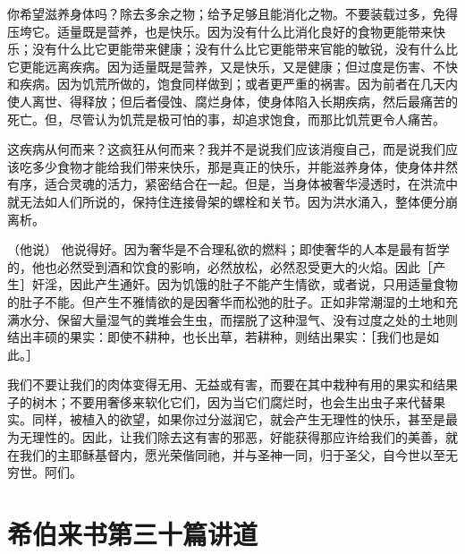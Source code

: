 你希望滋养身体吗？除去多余之物；给予足够且能消化之物。不要装载过多，免得压垮它。适量既是营养，也是快乐。因为没有什么比消化良好的食物更能带来快乐；没有什么比它更能带来健康；没有什么比它更能带来官能的敏锐，没有什么比它更能远离疾病。因为适量既是营养，又是快乐，又是健康；但过度是伤害、不快和疾病。因为饥荒所做的，饱食同样做到；或者更严重的祸害。因为前者在几天内使人离世、得释放；但后者侵蚀、腐烂身体，使身体陷入长期疾病，然后最痛苦的死亡。但，尽管认为饥荒是极可怕的事，却追求饱食，而那比饥荒更令人痛苦。\par

这疾病从何而来？这疯狂从何而来？我并不是说我们应该消瘦自己，而是说我们应该吃多少食物才能给我们带来快乐，那是真正的快乐，并能滋养身体，使身体井然有序，适合灵魂的活力，紧密结合在一起。但是，当身体被奢华浸透时，在洪流中就无法如人们所说的，保持住连接骨架的螺栓和关节。因为洪水涌入，整体便分崩离析。\par

（他说） 他说得好。因为奢华是不合理私欲的燃料；即使奢华的人本是最有哲学的，他也必然受到酒和饮食的影响，必然放松，必然忍受更大的火焰。因此［产生］奸淫，因此产生通奸。因为饥饿的肚子不能产生情欲，或者说，只用适量食物的肚子不能。但产生不雅情欲的是因奢华而松弛的肚子。正如非常潮湿的土地和充满水分、保留大量湿气的粪堆会生虫，而摆脱了这种湿气、没有过度之处的土地则结出丰硕的果实：即使不耕种，也长出草，若耕种，则结出果实：［我们也是如此。］\par

我们不要让我们的肉体变得无用、无益或有害，而要在其中栽种有用的果实和结果子的树木；不要用奢侈来软化它们，因为当它们腐烂时，也会生出虫子来代替果实。同样，被植入的欲望，如果你过分滋润它，就会产生无理性的快乐，甚至是最为无理性的。因此，让我们除去这有害的邪恶，好能获得那应许给我们的美善，就在我们的主耶稣基督内，愿光荣偕同祂，并与圣神一同，归于圣父，自今世以至无穷世。阿们。\par



\section{希伯来书第三十篇讲道}

